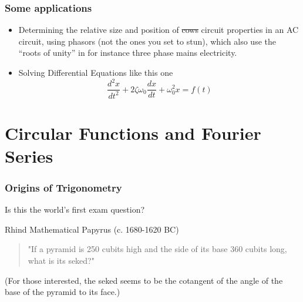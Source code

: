 \documentclass{beamer}
\begin{document}
\begin{frame}
  \frametitle{Some applications}
  
  \begin{itemize}
    \item Determining the relative size and position of \sout{cows} circuit properties in an AC circuit, using \alert{phasors} (not the ones you set to stun), which also use the ``roots of unity'' in for instance three phase mains electricity.
    \item Solving Differential Equations like this one
    \[
    \frac{d^2x}{dt^2}  + 2\zeta \omega_0 \frac{dx}{dt} + \omega_0^2 x = f(t)
    \]
    \begin{center}
  \end{center}
  \end{itemize} 
\end{frame}


\section{Circular Functions and Fourier Series}


\begin{frame}
  \frametitle{Origins of Trigonometry}
  
Is this the world's first exam question?  
  
\begin{block}{Rhind Mathematical Papyrus (c. 1680-1620 BC)}
\begin{quote}
"If a pyramid is 250 cubits high and the side of its base 360 cubits long, what is its seked?"
\end{quote}
\end{block}

(For those interested, the \alert{seked} seems to be the cotangent of the angle of the base of the pyramid to its face.)  
\end{frame}
\end{document}

